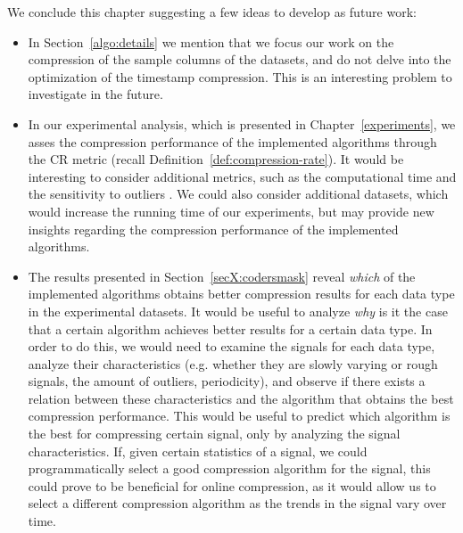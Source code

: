 We conclude this chapter suggesting a few ideas to develop as future work:

\vspace{-5pt}

\begin{itemize}

\item In Section~\ref{algo:details} we mention that we focus our work on the compression of the sample columns of the datasets, and do not delve into the optimization of the timestamp compression. This is an interesting problem to investigate in the future.

\item In our experimental analysis, which is presented in Chapter~\ref{experiments}, we asses the compression performance of the implemented algorithms through the CR metric (recall Definition~\ref{def:compression-rate}). It would be interesting to consider additional metrics, such as the computational time and the sensitivity to outliers \cite{AnEva2013}. We could also consider additional datasets, which would increase the running time of our experiments, but may provide new insights regarding the compression performance of the implemented algorithms.

\item The results presented in Section~\ref{secX:codersmask} reveal \textit{which} of the implemented algorithms obtains better compression results for each data type in the experimental datasets. It would be useful to analyze \textit{why} is it the case that a certain algorithm achieves better results for a certain data type. In order to do this, we would need to examine the signals for each data type, analyze their characteristics (e.g. whether they are slowly varying or rough signals, the amount of outliers, periodicity), and observe if there exists a relation between these characteristics and the algorithm that obtains the best compression performance. This would be useful to predict which algorithm is the best for compressing certain signal, only by analyzing the signal characteristics. If, given certain statistics of a signal, we could programmatically select a good compression algorithm for the signal, this could prove to be beneficial for online compression, as it would allow us to select a different compression algorithm as the trends in the signal vary over time.

\end{itemize}

